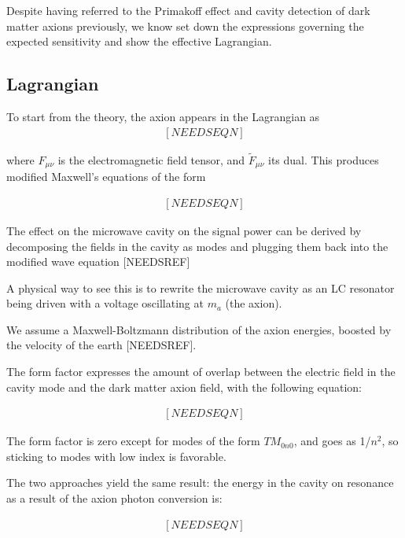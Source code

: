 \documentclass[12pt, twoside]{book}
\begin{document}
Despite having referred to the Primakoff effect and cavity detection of dark matter axions previously, we know set down the expressions governing the expected sensitivity and show the effective Lagrangian.

\subsection{Lagrangian}

To start from the theory, the axion appears in the Lagrangian as 
\begin{eqnarray}

[NEEDSEQN]

\end{eqnarray}

where $F_{\mu\nu}$ is the electromagnetic field tensor, and $\tilde F_{\mu\nu}$ its dual. This produces modified Maxwell's equations of the form

\begin{eqnarray}

[NEEDSEQN]

\end{eqnarray}

The effect on the microwave cavity on the signal power can be derived by decomposing the fields in the cavity as modes and plugging them back into the modified wave equation [NEEDSREF]

A physical way to see this is to rewrite the microwave cavity as an LC resonator being driven with a voltage oscillating at $m_a$ (the axion).

We assume a Maxwell-Boltzmann distribution of the axion energies, boosted by the velocity of the earth [NEEDSREF].

The form factor expresses the amount of overlap between the electric field in the cavity mode and the dark matter axion field, with the following equation:

\begin{eqnarray}

[NEEDSEQN]

\end{eqnarray}

The form factor is zero except for modes of the form $TM_{0n0}$, and goes as 1/$n^2$, so sticking to modes with low index is favorable.

The two approaches yield the same result: the energy in the cavity on resonance as a result of the axion photon conversion is:

\begin{eqnarray}

[NEEDSEQN]

\end{eqnarray}
\end{document}
